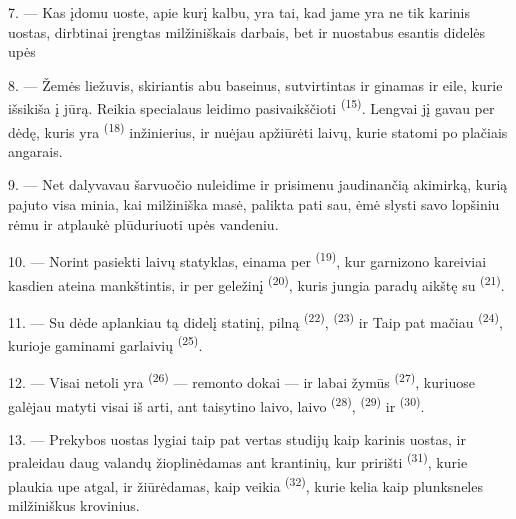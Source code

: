 \VUsaut{3.0mm}
\VUsaut{3.0mm}

7. --- Kas įdomu uoste, apie kurį kalbu, yra tai, kad jame yra ne tik karinis uostas,
dirbtinai įrengtas milžiniškais darbais, bet ir nuostabus 
esantis didelės upės 

8. --- Žemės liežuvis, skiriantis abu baseinus, sutvirtintas ir ginamas
 ir  eile, kurie išsikiša į jūrą. Reikia
specialaus leidimo pasivaikščioti  \textsuperscript{(15)}. Lengvai jį
gavau per dėdę, kuris yra  \textsuperscript{(18)} inžinierius,
ir nuėjau apžiūrėti laivų, kurie statomi po plačiais angarais.

9. --- Net dalyvavau šarvuočio nuleidime ir prisimenu jaudinančią akimirką, kurią
pajuto visa minia, kai milžiniška masė, palikta pati sau, ėmė slysti savo lopšiniu
rėmu ir atplaukė plūduriuoti upės vandeniu.

10. --- Norint pasiekti laivų statyklas, einama per 
\textsuperscript{(19)}, kur garnizono kareiviai kasdien ateina mankštintis, ir per
geležinį  \textsuperscript{(20)}, kuris jungia paradų aikštę su
 \textsuperscript{(21)}.

\VUsaut{3.0mm}
\VUsaut{3.0mm}

11. --- Su dėde aplankiau tą didelį statinį, pilną 
\textsuperscript{(22)},  \textsuperscript{(23)} ir  Taip pat mačiau  \textsuperscript{(24)}, kurioje
gaminami garlaivių  \textsuperscript{(25)}.

12. --- Visai netoli yra  \textsuperscript{(26)} --- remonto dokai --- ir
labai žymūs  \textsuperscript{(27)}, kuriuose galėjau
matyti visai iš arti, ant taisytino laivo, laivo 
\textsuperscript{(28)},  \textsuperscript{(29)} ir 
\textsuperscript{(30)}.

13. --- Prekybos uostas lygiai taip pat vertas studijų kaip karinis uostas, ir
praleidau daug valandų žioplinėdamas ant krantinių, kur pririšti  \textsuperscript{(31)}, kurie plaukia upe atgal, ir žiūrėdamas, kaip veikia
 \textsuperscript{(32)}, kurie kelia kaip plunksneles
milžiniškus krovinius.

